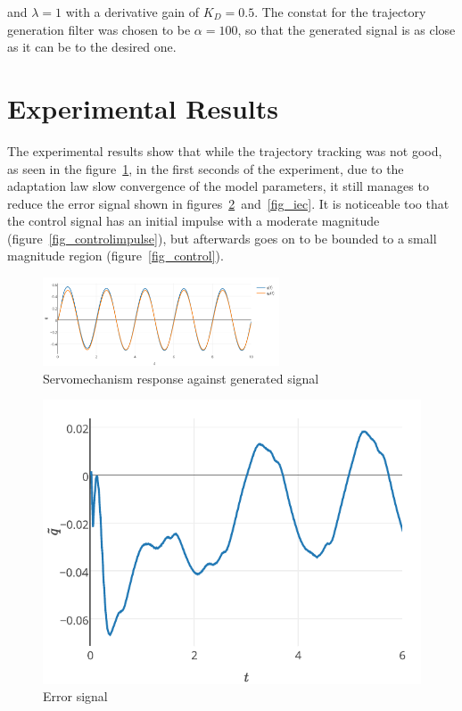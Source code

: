 \documentclass[journal]{IEEEtran}
\begin{document}
    and $\lambda = 1$ with a derivative gain of $K_D = 0.5$. The constat for the trajectory generation filter was chosen to be $\alpha = 100$, so that the generated signal is as close as it can be to the desired one.

\section{Experimental Results}
    The experimental results show that while the trajectory tracking was not good, as seen in the figure~\ref{fig_respuesta}, in the first seconds of the experiment, due to the adaptation law slow convergence of the model parameters, it still manages to reduce the error signal shown in figures~\ref{fig_error}~and~\ref{fig_iec}. It is noticeable too that the control signal has an initial impulse with a moderate magnitude (figure~\ref{fig_controlimpulse}), but afterwards goes on to be bounded to a small magnitude region (figure~\ref{fig_control}).

\begin{figure}[!t]
    \centering
    \includegraphics[width=7cm]{respuestatrayectoria}
    \caption{Servomechanism response against generated signal}
    \label{fig_respuesta}
\end{figure}

\begin{figure}[!t]
    \centering
    \includegraphics[width=\textwidth]{error}
    \caption{Error signal}
    \label{fig_error}
\end{figure}
\end{document}
